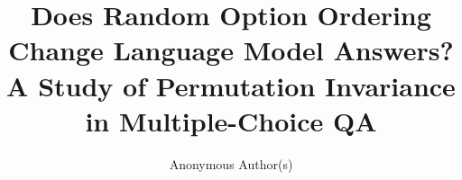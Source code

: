 \documentclass[11pt]{article}
\title{Does Random Option Ordering Change Language Model Answers? A Study of Permutation Invariance in Multiple-Choice QA}
\author{Anonymous Author(s)}
\date{}
\begin{document}
\maketitle
\begin{abstract}

\end{abstract}







\end{document}
